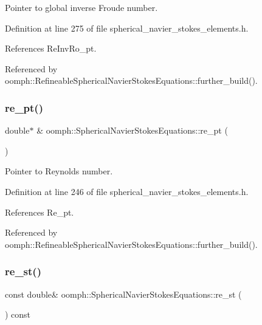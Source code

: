 Pointer to global inverse Froude number. 



Definition at line 275 of file spherical\+\_\+navier\+\_\+stokes\+\_\+elements.\+h.



References Re\+Inv\+Ro\+\_\+pt.



Referenced by oomph\+::\+Refineable\+Spherical\+Navier\+Stokes\+Equations\+::further\+\_\+build().

\mbox{\label{classoomph_1_1SphericalNavierStokesEquations_a2ee12f1bb031d2bc22db89daa341ffb9}} 
\subsubsection{\texorpdfstring{re\+\_\+pt()}{re\_pt()}}
{\footnotesize\ttfamily double$\ast$ \& oomph\+::\+Spherical\+Navier\+Stokes\+Equations\+::re\+\_\+pt (\begin{DoxyParamCaption}{ }\end{DoxyParamCaption})\hspace{0.3cm}{\ttfamily [inline]}}



Pointer to Reynolds number. 



Definition at line 246 of file spherical\+\_\+navier\+\_\+stokes\+\_\+elements.\+h.



References Re\+\_\+pt.



Referenced by oomph\+::\+Refineable\+Spherical\+Navier\+Stokes\+Equations\+::further\+\_\+build().

\mbox{\label{classoomph_1_1SphericalNavierStokesEquations_af3627c5846c81dacdfb150576a28db61}} 
\subsubsection{\texorpdfstring{re\+\_\+st()}{re\_st()}}
{\footnotesize\ttfamily const double\& oomph\+::\+Spherical\+Navier\+Stokes\+Equations\+::re\+\_\+st (\begin{DoxyParamCaption}{ }\end{DoxyParamCaption}) const\hspace{0.3cm}{\ttfamily [inline]}}



